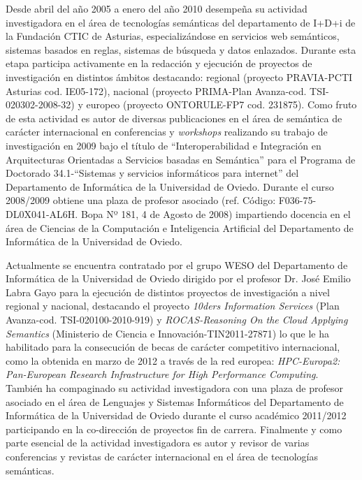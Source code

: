 Desde abril del año 2005 a enero del año 2010 desempeña su actividad investigadora en el área de tecnologías semánticas 
del departamento de I+D+i de la Fundación CTIC de Asturias, especializándose en servicios web semánticos, sistemas basados en reglas, sistemas de búsqueda y 
datos enlazados. Durante esta etapa participa activamente en la redacción y ejecución de proyectos de investigación en distintos ámbitos 
destacando: regional (proyecto PRAVIA-PCTI Asturias cod. IE05-172), nacional (proyecto PRIMA-Plan Avanza-cod. TSI-020302-2008-32) y 
europeo (proyecto ONTORULE-FP7 cod. 231875). Como fruto de esta actividad es autor de diversas publicaciones en el área de semántica 
de carácter internacional en conferencias y \textit{workshops} realizando su trabajo de investigación en 2009 bajo 
el título de ``Interoperabilidad e Integración en Arquitecturas Orientadas a Servicios basadas en Semántica'' para el Programa de 
Doctorado 34.1-``Sistemas y servicios informáticos para internet'' del Departamento de Informática de la Universidad de Oviedo. Durante el curso 2008/2009 obtiene una plaza de profesor asociado (ref. Código: F036-75-DL0X041-AL6H. Bopa Nº 181, 4 de Agosto de 2008) 
impartiendo docencia en el área de Ciencias de la Computación e Inteligencia Artificial del Departamento de Informática de la Universidad de Oviedo. 


Actualmente se encuentra contratado por el grupo WESO del Departamento de Informática de la Universidad de Oviedo dirigido por 
el profesor Dr. José Emilio Labra Gayo para la ejecución de distintos proyectos de investigación a nivel regional y nacional, destacando  
el proyecto \textit{10ders Information Services} (Plan Avanza-cod. TSI-020100-2010-919) y \textit{ROCAS-Reasoning On the Cloud Applying Semantics} 
(Ministerio de Ciencia e Innovación-TIN2011-27871) lo que le ha habilitado para la consecución de becas de carácter competitivo internacional, 
como la obtenida en marzo de 2012 a través de la red europea: \textit{HPC-Europa2: Pan-European Research Infrastructure for High Performance Computing}.
 También ha compaginado su actividad investigadora con una plaza de profesor asociado en el área de Lenguajes y Sistemas Informáticos del Departamento de Informática de la Universidad de Oviedo durante el curso académico 
2011/2012 participando en la co-dirección de proyectos fin de carrera. Finalmente y como parte esencial de la actividad investigadora 
es autor y revisor de varias conferencias y revistas de carácter internacional en el área de tecnologías semánticas.



